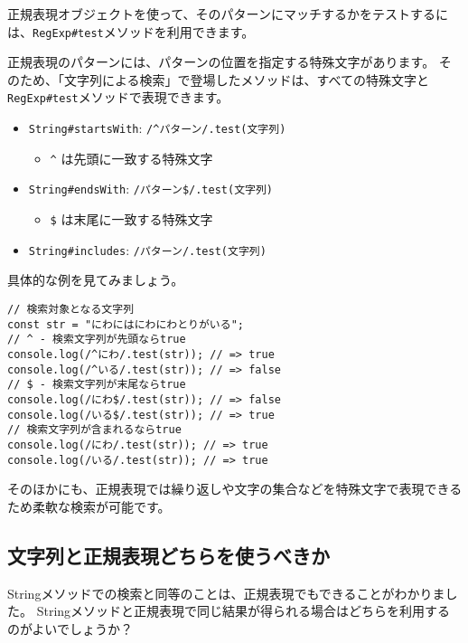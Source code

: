 正規表現オブジェクトを使って、そのパターンにマッチするかをテストするには、\texttt{RegExp\#test}メソッドを利用できます。

正規表現のパターンには、パターンの位置を指定する特殊文字があります。
そのため、「文字列による検索」で登場したメソッドは、すべての特殊文字と\texttt{RegExp\#test}メソッドで表現できます。

\begin{itemize}
\item
  \texttt{String\#startsWith}:
  \texttt{/\^{}パターン/.test(文字列)}

  \begin{itemize}
  \item
    \texttt{\^{}} は先頭に一致する特殊文字
  \end{itemize}
\item
  \texttt{String\#endsWith}:
  \texttt{/パターン\$/.test(文字列)}

  \begin{itemize}
  \item
    \texttt{\$} は末尾に一致する特殊文字
  \end{itemize}
\item
  \texttt{String\#includes}:
  \texttt{/パターン/.test(文字列)}
\end{itemize}

具体的な例を見てみましょう。

\begin{lstlisting}
// 検索対象となる文字列
const str = "にわにはにわにわとりがいる";
// ^ - 検索文字列が先頭ならtrue
console.log(/^にわ/.test(str)); // => true
console.log(/^いる/.test(str)); // => false
// $ - 検索文字列が末尾ならtrue
console.log(/にわ$/.test(str)); // => false
console.log(/いる$/.test(str)); // => true
// 検索文字列が含まれるならtrue
console.log(/にわ/.test(str)); // => true
console.log(/いる/.test(str)); // => true
\end{lstlisting}

そのほかにも、正規表現では繰り返しや文字の集合などを特殊文字で表現できるため柔軟な検索が可能です。

\hypertarget{string-or-regexp}{%
\subsection{文字列と正規表現どちらを使うべきか}\label{string-or-regexp}}

Stringメソッドでの検索と同等のことは、正規表現でもできることがわかりました。
Stringメソッドと正規表現で同じ結果が得られる場合はどちらを利用するのがよいでしょうか？

